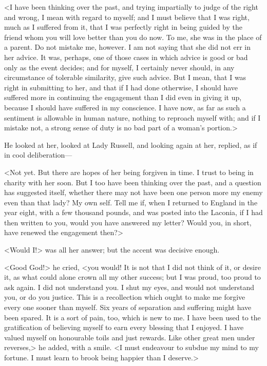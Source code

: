 <I have been thinking over the past, and trying impartially to judge of the right and wrong, I mean with regard to myself; and I must believe that I was right, much as I suffered from it, that I was perfectly right in being guided by the friend whom you will love better than you do now. To me, she was in the place of a parent. Do not mistake me, however. I am not saying that she did not err in her advice. It was, perhaps, one of those cases in which advice is good or bad only as the event decides; and for myself, I certainly never should, in any circumstance of tolerable similarity, give such advice. But I mean, that I was right in submitting to her, and that if I had done otherwise, I should have suffered more in continuing the engagement than I did even in giving it up, because I should have suffered in my conscience. I have now, as far as such a sentiment is allowable in human nature, nothing to reproach myself with; and if I mistake not, a strong sense of duty is no bad part of a woman's portion.>

He looked at her, looked at Lady Russell, and looking again at her, replied, as if in cool deliberation—

<Not yet. But there are hopes of her being forgiven in time. I trust to being in charity with her soon. But I too have been thinking over the past, and a question has suggested itself, whether there may not have been one person more my enemy even than that lady? My own self. Tell me if, when I returned to England in the year eight, with a few thousand pounds, and was posted into the Laconia, if I had then written to you, would you have answered my letter? Would you, in short, have renewed the engagement then?>

<Would I\@!> was all her answer; but the accent was decisive enough.

<Good God!> he cried, <you would! It is not that I did not think of it, or desire it, as what could alone crown all my other success; but I was proud, too proud to ask again. I did not understand you. I shut my eyes, and would not understand you, or do you justice. This is a recollection which ought to make me forgive every one sooner than myself. Six years of separation and suffering might have been spared. It is a sort of pain, too, which is new to me. I have been used to the gratification of believing myself to earn every blessing that I enjoyed. I have valued myself on honourable toils and just rewards. Like other great men under reverses,> he added, with a smile. <I must endeavour to subdue my mind to my fortune. I must learn to brook being happier than I deserve.>